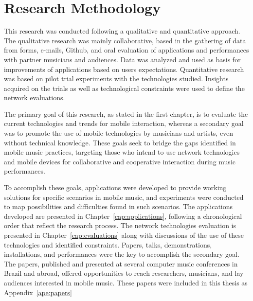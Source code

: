 \chapter{Research Methodology}
\label{cap:research}

This research was conducted following a qualitative and quantitative approach.
The qualitative research was mainly collaborative, based in the gathering of data from forms, e-mails, Github, and oral evaluation of applications and performances with partner musicians and audiences.
Data was analyzed and used as basis for improvements of applications based on users expectations.
Quantitative research was based on pilot trial experiments with the technologies studied.
Insights acquired on the trials as well as technological constraints were used to define the network evaluations.

The primary goal of this research, as stated in the first chapter, is to evaluate the current technologies and trends for mobile interaction, whereas 
a secondary goal was to promote the use of mobile technologies by musicians and artists, even without technical knowledge.
These goals seek to bridge the gaps identified in mobile music practices, targeting those who intend to use network technologies and mobile devices for collaborative and cooperative interaction during music performances.


To accomplish these goals, applications were developed to provide working solutions for specific scenarios in mobile music, and experiments were conducted to map possibilities and difficulties found in such scenarios.
The applications developed are presented in Chapter~\ref{cap:applications}, following a chronological order that reflect the research process.
The network technologies evaluation is presented in Chapter~\ref{cap:evaluations} along with discussions of the use of these technologies and identified constraints.
Papers, talks, demonstrations, installations, and performances were the key to accomplish the secondary goal.
The papers, published and presented at several computer music conferences in Brazil and abroad, offered opportunities to reach researchers, musicians, and lay audiences interested in mobile music.
These papers were included in this thesis as Appendix~\ref{ape:papers}


